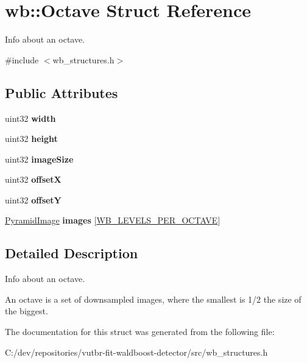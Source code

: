 \hypertarget{structwb_1_1_octave}{}\section{wb\+:\+:Octave Struct Reference}
\label{structwb_1_1_octave}


Info about an octave.  




{\ttfamily \#include $<$wb\+\_\+structures.\+h$>$}

\subsection*{Public Attributes}
\begin{DoxyCompactItemize}
\item 
\hypertarget{structwb_1_1_octave_a1ffea70dec3ab98d123ef6cea4d5c1c1}{}uint32 {\bfseries width}\label{structwb_1_1_octave_a1ffea70dec3ab98d123ef6cea4d5c1c1}

\item 
\hypertarget{structwb_1_1_octave_afdf8eb3202f56b86fe92b92b79ffd13c}{}uint32 {\bfseries height}\label{structwb_1_1_octave_afdf8eb3202f56b86fe92b92b79ffd13c}

\item 
\hypertarget{structwb_1_1_octave_a5c0aad9e446ee99099854068048aa6da}{}uint32 {\bfseries image\+Size}\label{structwb_1_1_octave_a5c0aad9e446ee99099854068048aa6da}

\item 
\hypertarget{structwb_1_1_octave_ad8466f10c765c3163444f079b67df23b}{}uint32 {\bfseries offset\+X}\label{structwb_1_1_octave_ad8466f10c765c3163444f079b67df23b}

\item 
\hypertarget{structwb_1_1_octave_ac1f9bd1002592a7fa44a207bbd6e55a5}{}uint32 {\bfseries offset\+Y}\label{structwb_1_1_octave_ac1f9bd1002592a7fa44a207bbd6e55a5}

\item 
\hypertarget{structwb_1_1_octave_a0f31438d2b1ebe3c85f6acb3b008b00b}{}\hyperlink{structwb_1_1_pyramid_image}{Pyramid\+Image} {\bfseries images} \mbox{[}\hyperlink{wb__general_8h_a030a247d769d3e676108d35add058810}{W\+B\+\_\+\+L\+E\+V\+E\+L\+S\+\_\+\+P\+E\+R\+\_\+\+O\+C\+T\+A\+V\+E}\mbox{]}\label{structwb_1_1_octave_a0f31438d2b1ebe3c85f6acb3b008b00b}

\end{DoxyCompactItemize}


\subsection{Detailed Description}
Info about an octave. 

An octave is a set of downsampled images, where the smallest is 1/2 the size of the biggest. 

The documentation for this struct was generated from the following file\+:\begin{DoxyCompactItemize}
\item 
C\+:/dev/repositories/vutbr-\/fit-\/waldboost-\/detector/src/wb\+\_\+structures.\+h\end{DoxyCompactItemize}
